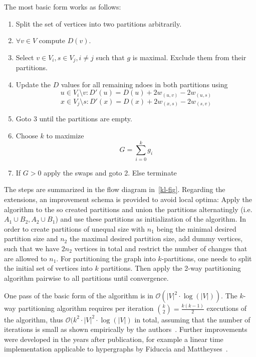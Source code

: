                The most basic form works as follows:
                \begin{enumerate}
                 \item Split the set of vertices into two partitions arbitrarily.
                 \item $\forall v \in V$ compute $D(v)$.
                 \item Select $v \in V_i, s \in V_j, i \neq j$ such that $g$ is maximal. Exclude them from their partitions.
                 \item Update the $D$ values for all remaining ndoes in both partitions using 
                 \[ u \in V_i \setminus {v}: D'(u) = D(u) + 2 w_{(u, v)} - 2 w_{(u, s)} \]
                 \[ x \in V_j \setminus {s}: D'(x) = D(x) + 2 w_{(x, s)} - 2 w_{(s, v)} \]
                 \item Goto 3 until the partitions are empty.
                 \item Choose $k$ to maximize 
                 \[ G = \sum^k_{i = 0} g_i \]
                 \item If $G > 0$ apply the swaps and goto 2. Else terminate
                \end{enumerate}
                The steps are summarized in the flow diagram in~\ref{kl-fig}.
                Regarding the extensions, an improvement schema is provided to avoid local optima:
                Apply the algorithm to the so created partitions and union the partitions alternatingly (i.e. $A_1 \cup B_2, A_2 \cup B_1$) and use these partitions as initialization of the algorithm.
                In order to create partitions of unequal size with $n_1$ being the minimal desired partition size and $n_2$ the maximal desired partition size, add dummy vertices, such that we have $2n_2$ vertices in total and restrict the number of changes that are allowed to $n_1$.
                For partitioning the graph into $k$-partitions, one needs to split the initial set of vertices into $k$ partitions. 
                Then apply the 2-way partitioning algorithm pairwise to all partitions until convergence.
                
                One pass of the basic form of the algorithm is in $\mathcal{O}(|V|^2 \cdot \log(|V|))$. The $k$-way partitioning algorithm requires per iteration $\binom{k}{2} = \frac{k (k - 1)}{2}$ executions of the algorithm, thus $\mathcal{O}(k^2 \cdot |V|^2 \cdot \log(|V|)$ in total, assuming that the number of iterations is small as shown empirically by the authors~\autocite{kl}. Further improvements were developed in the years after publication, for example a linear time implementation applicable to hypergraphs by Fiduccia and Mattheyses~\autocite{fm}.

